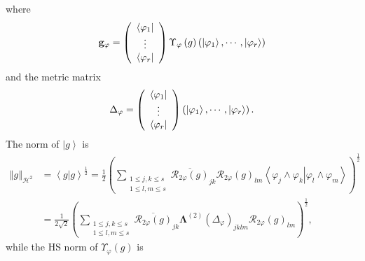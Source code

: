 \documentclass[aps,preprint]{revtex4}%
\begin{document}
where
\begin{equation}
\mathbf{g}_{\varphi}=\left(
\begin{array}
[c]{c}%
\left\langle \varphi_{1}\right\vert \\
\vdots\\
\left\langle \varphi_{r}\right\vert
\end{array}
\right)  \Upsilon_{\varphi}\left(  g\right)  \left(  \left\vert \varphi
_{1}\right\rangle ,\cdots,\left\vert \varphi_{r}\right\rangle \right)
\end{equation}
and the metric matrix
\begin{equation}
\Delta_{\varphi}=\left(
\begin{array}
[c]{c}%
\left\langle \varphi_{1}\right\vert \\
\vdots\\
\left\langle \varphi_{r}\right\vert
\end{array}
\right)  \left(  \left\vert \varphi_{1}\right\rangle ,\cdots,\left\vert
\varphi_{r}\right\rangle \right)  .
\end{equation}
The norm of $\left\vert g\right\rangle $ is
\begin{align}
\left\Vert g\right\Vert _{\mathcal{H}^{2}}  &  =\left\langle \left.
g\right\vert g\right\rangle ^{\frac{1}{2}}=\frac{1}{2}\left(  \sum
_{\substack{1\leq j,k\leq s\\1\leq l,m\leq s}}\overline{\mathcal{R}_{2\varphi
}\left(  g\right)  }_{jk}\mathcal{R}_{2\varphi}\left(  g\right)
_{lm}\left\langle \left.  \varphi_{j}\wedge\varphi_{k}\right\vert \varphi
_{l}\wedge\varphi_{m}\right\rangle \right)  ^{\frac{1}{2}}\\
&  =\frac{1}{2\sqrt{2}}\left(  \sum_{\substack{1\leq j,k\leq s\\1\leq l,m\leq
s}}\overline{\mathcal{R}_{2\varphi}\left(  g\right)  }_{jk}\mathbf{\Lambda
}^{\left(  2\right)  }\left(  \Delta_{\varphi}\right)  _{jklm}\mathcal{R}%
_{2\varphi}\left(  g\right)  _{lm}\right)  ^{\frac{1}{2}},
\end{align}
while the HS norm of $\Upsilon_{\varphi}\left(  g\right)  $ is
\end{document}
